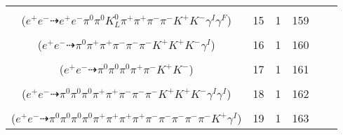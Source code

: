 \documentclass[landscape]{article}
\newcounter{rownumbers}
\newcommand\rn{\stepcounter{rownumbers}\arabic{rownumbers}}
\newcommand{\EOL}{\\} %
\newcommand{\topoTags}[1]{#1} %
\begin{document}
\begin{longtable}{clcccc}
\rn & \makecell[l]{ $ 
e^{+} e^{-} \rightarrow \pi^{0} \pi^{0} \pi^{+} K^{0} \bar{K}^{0} K^{*} K^{-} \gamma^{I} ,
\pi^{0} \rightarrow e^{+} e^{-} \gamma^{F} ,
K^{0} \rightarrow K_{L}^{0} ,
\bar{K}^{0} \rightarrow K_{L}^{0} ,
K^{*} \rightarrow \pi^{-} K^{+} ,
K_{L}^{0} \rightarrow \pi^{0} \pi^{+} \pi^{-} 
$ \\ ($
e^{+} e^{-} \dashrightarrow e^{+} e^{-} \pi^{0} \pi^{0} K_{L}^{0} \pi^{+} \pi^{+} \pi^{-} \pi^{-} K^{+} K^{-} \gamma^{I} \gamma^{F} 
$) } & \topoTags{15 & }1 & 159 \EOL

\rn & \makecell[l]{ $ 
e^{+} e^{-} \rightarrow \pi^{0} \pi^{-} \bar{K}^{*} K^{+} K^{+} K^{*-} \gamma^{I} ,
\bar{K}^{*} \rightarrow \pi^{+} K^{-} ,
K^{*-} \rightarrow \pi^{-} \bar{K}^{0} ,
\bar{K}^{0} \rightarrow K_{S}^{0} ,
K_{S}^{0} \rightarrow \pi^{+} \pi^{-} 
$ \\ ($
e^{+} e^{-} \dashrightarrow \pi^{0} \pi^{+} \pi^{+} \pi^{-} \pi^{-} \pi^{-} K^{+} K^{+} K^{-} \gamma^{I} 
$) } & \topoTags{16 & }1 & 160 \EOL

\rn & \makecell[l]{ $ 
e^{+} e^{-} \rightarrow \pi^{0} \pi^{0} \rho^{-} \bar{K}^{*} K^{+} ,
\rho^{-} \rightarrow \pi^{0} \pi^{-} ,
\bar{K}^{*} \rightarrow \pi^{+} K^{-} 
$ \\ ($
e^{+} e^{-} \dashrightarrow \pi^{0} \pi^{0} \pi^{0} \pi^{+} \pi^{-} K^{+} K^{-} 
$) } & \topoTags{17 & }1 & 161 \EOL

\rn & \makecell[l]{ $ 
e^{+} e^{-} \rightarrow \pi^{0} \pi^{0} \pi^{-} \omega \bar{K}^{0} K^{+} \phi \gamma^{I} \gamma^{I} ,
\omega \rightarrow \pi^{0} \pi^{+} \pi^{-} ,
\bar{K}^{0} \rightarrow K_{S}^{0} ,
\phi \rightarrow K^{+} K^{-} ,
K_{S}^{0} \rightarrow \pi^{+} \pi^{-} 
$ \\ ($
e^{+} e^{-} \dashrightarrow \pi^{0} \pi^{0} \pi^{0} \pi^{+} \pi^{+} \pi^{-} \pi^{-} \pi^{-} K^{+} K^{+} K^{-} \gamma^{I} \gamma^{I} 
$) } & \topoTags{18 & }1 & 162 \EOL

\rn & \makecell[l]{ $ 
e^{+} e^{-} \rightarrow \pi^{0} \pi^{0} \pi^{+} \pi^{+} \pi^{+} \pi^{-} \pi^{-} \rho^{-} \rho^{-} \bar{K}^{0} K^{+} \gamma^{I} ,
\rho^{-} \rightarrow \pi^{0} \pi^{-} ,
\rho^{-} \rightarrow \pi^{0} \pi^{-} ,
\bar{K}^{0} \rightarrow K_{S}^{0} ,
K_{S}^{0} \rightarrow \pi^{+} \pi^{-} 
$ \\ ($
e^{+} e^{-} \dashrightarrow \pi^{0} \pi^{0} \pi^{0} \pi^{0} \pi^{+} \pi^{+} \pi^{+} \pi^{+} \pi^{-} \pi^{-} \pi^{-} \pi^{-} \pi^{-} K^{+} \gamma^{I} 
$) } & \topoTags{19 & }1 & 163 \EOL


\end{longtable}
\end{document}
